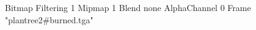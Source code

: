 {Bitmap
	{Filtering 1}
	{Mipmap 1}
	{Blend none}
	{AlphaChannel 0}
	{Frame "plantree2#burned.tga"}
}
